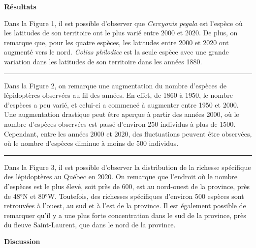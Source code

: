 \documentclass[9pt,twocolumn,twoside,]{pnas-new}
\begin{document}
\vspace{10pt}

\textbf{Résultats}

Dans la Figure 1, il est possible d'observer que \emph{Cercyonis pegala}
est l'espèce où les latitudes de son territoire ont le plus varié entre
2000 et 2020. De plus, on remarque que, pour les quatre espèces, les
latitudes entre 2000 et 2020 ont augmenté vers le nord. \emph{Colias
philodice} est la seule espèce avec une grande variation dans les
latitudes de son territoire dans les années 1880.

\begin{center}\rule{0.5\linewidth}{0.5pt}\end{center}

Dans la Figure 2, on remarque une augmentation du nombre d'espèces de
lépidoptères observées au fil des années. En effet, de 1860 à 1950, le
nombre d'espèces a peu varié, et celui-ci a commencé à augmenter entre
1950 et 2000. Une augmentation drastique peut être aperçue à partir des
années 2000, où le nombre d'espèces observées est passé d'environ 250
individus à plus de 1500. Cependant, entre les années 2000 et 2020, des
fluctuations peuvent être observées, où le nombre d'espèces diminue à
moins de 500 individus.

\begin{center}\rule{0.5\linewidth}{0.5pt}\end{center}

Dans la Figure 3, il est possible d'observer la distribution de la
richesse spécifique des lépidoptères au Québec en 2020. On remarque que
l'endroit où le nombre d'espèces est le plus élevé, soit près de 600,
est au nord-ouest de la province, près de 48°N et 80°W. Toutefois, des
richesses spécifiques d'environ 500 espèces sont retrouvées à l'ouest,
au sud et à l'est de la province. Il est également possible de remarquer
qu'il y a une plus forte concentration dans le sud de la province, près
du fleuve Saint-Laurent, que dans le nord de la province.

\vspace{10pt}

\textbf{Discussion }
\end{document}

